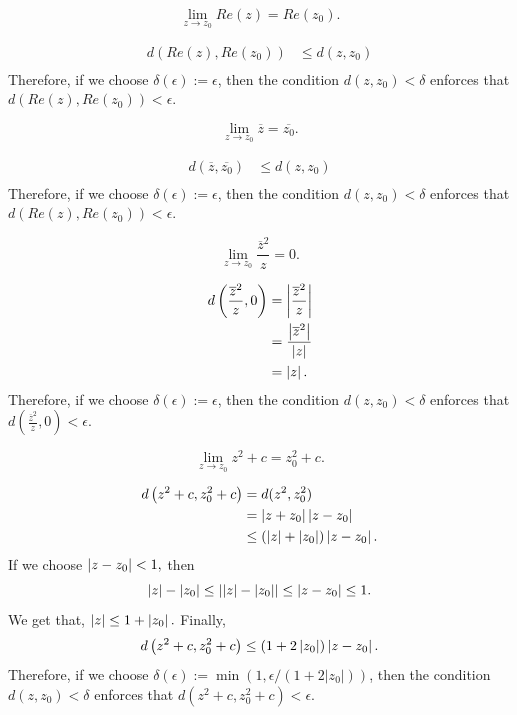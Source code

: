 \documentclass[12pt]{book}
\begin{document}
\begin{exmp}
    $$
        \lim_{z \rightarrow z_0} Re(z) = Re(z_0).
    $$
\end{exmp}
\begin{align*}
    d(Re(z), Re(z_0)) 
        &\leq
            d(z, z_0) \\
\end{align*}
Therefore, if we choose $\delta(\epsilon) := \epsilon$, then the condition $d(z, z_0) < \delta$ enforces that $d(Re(z), Re(z_0)) < \epsilon.$  

\begin{exmp}
    $$
        \lim_{z \rightarrow z_0} \overline{z} = \overline{z_0}.
    $$
\end{exmp}
\begin{align*}
    d(\overline{z}, \overline{z_0}) 
        &\leq
            d(z, z_0) \\
\end{align*}
Therefore, if we choose $\delta(\epsilon) := \epsilon$, then the condition $d(z, z_0) < \delta$ enforces that $d(Re(z), Re(z_0)) < \epsilon.$ 

\begin{exmp}
    $$
        \lim_{z \rightarrow z_0} \frac{\overline{z}^{2}}{z} = 0.
    $$
\end{exmp}
\begin{align*}
    d\left(\frac{\overline{z}^{2}}{z}, 0\right) 
        &=
           \left\lvert \frac{\overline{z}^{2}}{z} \right\rvert \\
        &= 
            \frac{\left\lvert \overline{z}^{2} \right\rvert}{\left\lvert z \right\rvert} \\
        &=
            \left\lvert z \right\rvert.
\end{align*}
Therefore, if we choose $\delta(\epsilon) := \epsilon$, then the condition $d(z, z_0) < \delta$ enforces that $d\left(\frac{\overline{z}^{2}}{z}, 0\right) < \epsilon.$ 

\begin{exmp}
    $$
        \lim_{z \rightarrow z_0} z^2 + c = z_{0}^{2} + c.
    $$
\end{exmp}
\begin{align*}
    d\left(z^2 + c, z_{0}^{2} + c\right) 
        &=
           d(z^{2}, z_{0}^{2}) \\
        &= 
            \left\lvert z + z_0 \right\rvert\left\lvert z - z_0 \right\rvert \\
        &\leq
            (\left\lvert z \right\rvert + \left\lvert z_0 \right\rvert)\left\lvert z - z_0 \right\rvert.
\end{align*}
If we choose $\left\lvert z - z_0 \right\rvert < 1,$ then
$$
    \left\lvert z \right\rvert - \left\lvert z_0 \right\rvert \leq \left\lvert \left\lvert z \right\rvert - \left\lvert z_0 \right\rvert \right\rvert \leq \left\lvert z - z_0 \right\rvert \leq 1.
$$
We get that, $\left\lvert z \right\rvert \leq 1 + \left\lvert z_0 \right\rvert.$ Finally,
$$
    d\left(z^2 + c, z_{0}^{2} + c\right) \leq (1 +2 \left\lvert z_0 \right\rvert) \left\lvert z - z_0 \right\rvert.
$$
Therefore, if we choose $\delta(\epsilon) := \min(1, \epsilon / (1 + 2|z_0|))$, then the condition $d(z, z_0) < \delta$ enforces that $d\left(z^2 + c, z_{0}^{2} + c\right)  < \epsilon.$ 
\end{document}
